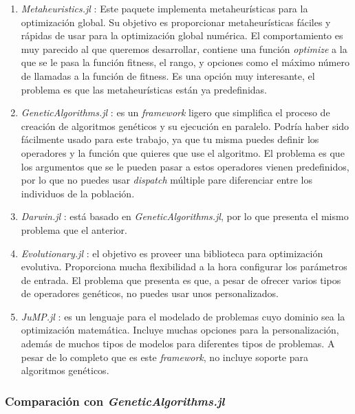 \begin{enumerate}
    \item \emph{Metaheuristics.jl} \cite{metaheuristics_jl}: Este paquete implementa metaheurísticas para la optimización global. Su objetivo es proporcionar metaheurísticas
    fáciles y rápidas de usar para la optimización global numérica. El comportamiento es muy parecido al que queremos desarrollar, contiene una función \emph{optimize}
    a la que se le pasa la función fitness, el rango, y opciones como el máximo número de llamadas a la función de fitness. Es una opción muy interesante, el problema es que las
    metaheurísticas están ya predefinidas.
    \item \emph{GeneticAlgorithms.jl} \cite{GeneticAlgorithms_jl}: es un \emph{framework} ligero que simplifica el proceso de creación de algoritmos genéticos y su ejecución en
    paralelo. Podría haber sido fácilmente usado para este trabajo, ya que tu misma puedes definir los operadores y la función que quieres que use el algoritmo. El problema es
    que los argumentos que se le pueden pasar a estos operadores vienen predefinidos, por lo que no puedes usar \emph{dispatch} múltiple pare diferenciar entre los individuos de 
    la población.
    \item \emph{Darwin.jl} \cite{darwin_jl}: está basado en \emph{GeneticAlgorithms.jl}, por lo que presenta el mismo problema que el anterior.
    \item \emph{Evolutionary.jl} \cite{evolutionary_jl}: el objetivo es proveer una biblioteca para optimización evolutiva. Proporciona mucha flexibilidad a la hora configurar los parámetros
    de entrada. El problema que presenta es que, a pesar de ofrecer varios tipos de operadores genéticos, no puedes usar unos personalizados.
    \item \emph{JuMP.jl} \cite{DunningHuchetteLubin2017}: es un lenguaje para el modelado de problemas cuyo dominio sea la optimización matemática. Incluye muchas opciones para la personalización,
    además de muchos tipos de modelos para diferentes tipos de problemas. A pesar de lo completo que es este \emph{framework}, no incluye soporte para algoritmos genéticos.
\end{enumerate}

\subsubsection{Comparación con \emph{GeneticAlgorithms.jl}}

